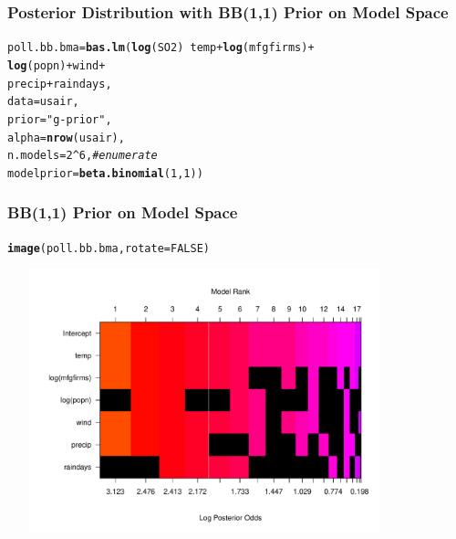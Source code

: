 \documentclass[]{beamer}\usepackage[]{graphicx}\usepackage[]{color}
\makeatletter
\newcommand{\hlnum}[1]{\textcolor[rgb]{0.686,0.059,0.569}{#1}}%
\newcommand{\hlstr}[1]{\textcolor[rgb]{0.192,0.494,0.8}{#1}}%
\newcommand{\hlcom}[1]{\textcolor[rgb]{0.678,0.584,0.686}{\textit{#1}}}%
\newcommand{\hlopt}[1]{\textcolor[rgb]{0,0,0}{#1}}%
\newcommand{\hlstd}[1]{\textcolor[rgb]{0.345,0.345,0.345}{#1}}%
\newcommand{\hlkwb}[1]{\textcolor[rgb]{0.69,0.353,0.396}{#1}}%
\newcommand{\hlkwc}[1]{\textcolor[rgb]{0.333,0.667,0.333}{#1}}%
\newcommand{\hlkwd}[1]{\textcolor[rgb]{0.737,0.353,0.396}{\textbf{#1}}}%
\newenvironment{kframe}{%
 \def\at@end@of@kframe{}%
 \ifinner\ifhmode%
  \def\at@end@of@kframe{\end{minipage}}%
  \begin{minipage}{\columnwidth}%
 \fi\fi%
 \def\FrameCommand##1{\hskip\@totalleftmargin \hskip-\fboxsep
 \colorbox{shadecolor}{##1}\hskip-\fboxsep
     \hskip-\linewidth \hskip-\@totalleftmargin \hskip\columnwidth}%
 \MakeFramed {\advance\hsize-\width
   \@totalleftmargin\z@ \linewidth\hsize
   \@setminipage}}%
 {\par\unskip\endMakeFramed%
 \at@end@of@kframe}
\newenvironment{knitrout}{}{} %
\makeatother
\begin{document}
\begin{frame}[fragile]\frametitle{Posterior Distribution  with BB(1,1) Prior on Model Space}


\begin{knitrout}
\color{fgcolor}\begin{kframe}
\begin{alltt}
\hlstd{poll.bb.bma} \hlkwb{=} \hlkwd{bas.lm}\hlstd{(}\hlkwd{log}\hlstd{(SO2)} \hlopt{~} \hlstd{temp} \hlopt{+} \hlkwd{log}\hlstd{(mfgfirms)} \hlopt{+}
                                \hlkwd{log}\hlstd{(popn)} \hlopt{+} \hlstd{wind} \hlopt{+}
                                \hlstd{precip} \hlopt{+} \hlstd{raindays,}
                     \hlkwc{data}\hlstd{=usair,}
                     \hlkwc{prior}\hlstd{=}\hlstr{"g-prior"}\hlstd{,}
                     \hlkwc{alpha}\hlstd{=}\hlkwd{nrow}\hlstd{(usair),}
                     \hlkwc{n.models}\hlstd{=}\hlnum{2}\hlopt{^}\hlnum{6}\hlstd{,}  \hlcom{#enumerate}
                     \hlkwc{modelprior}\hlstd{=}\hlkwd{beta.binomial}\hlstd{(}\hlnum{1}\hlstd{,}\hlnum{1}\hlstd{))}
\end{alltt}
\end{kframe}
\end{knitrout}

\end{frame}

\begin{frame}\frametitle{BB(1,1) Prior on Model Space}


\begin{knitrout}
\color{fgcolor}\begin{kframe}
\begin{alltt}
\hlkwd{image}\hlstd{(poll.bb.bma,} \hlkwc{rotate}\hlstd{=}\hlnum{FALSE}\hlstd{)}
\end{alltt}
\end{kframe}
\includegraphics[width=4.5in,height=3in]{figure/unnamed-chunk-5-1} 
\end{knitrout}
\end{frame}
\end{document}
